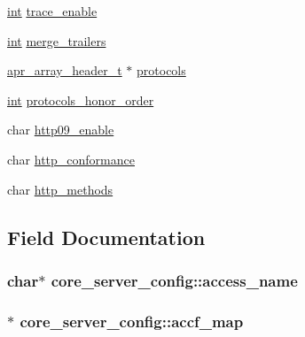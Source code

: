 \begin{DoxyCompactItemize}
\hyperlink{pcre_8txt_a42dfa4ff673c82d8efe7144098fbc198}{int} \hyperlink{structcore__server__config_a598d0e04d0dc423c9f5f9a24ca466a5d}{trace\+\_\+enable}
\item 
\hyperlink{pcre_8txt_a42dfa4ff673c82d8efe7144098fbc198}{int} \hyperlink{structcore__server__config_a2608fe3794c66bb783bff4af1191446a}{merge\+\_\+trailers}
\item 
\hyperlink{structapr__array__header__t}{apr\+\_\+array\+\_\+header\+\_\+t} $\ast$ \hyperlink{structcore__server__config_a81796a04abf27d6f4dabdcdad1d6b13b}{protocols}
\item 
\hyperlink{pcre_8txt_a42dfa4ff673c82d8efe7144098fbc198}{int} \hyperlink{structcore__server__config_a754d83749c2bd25bc387242215750138}{protocols\+\_\+honor\+\_\+order}
\item 
char \hyperlink{structcore__server__config_a82e5cee343c061c3fd801b5405439306}{http09\+\_\+enable}
\item 
char \hyperlink{structcore__server__config_a56088a7f6f6bdf65bc4b125b7bf8a57f}{http\+\_\+conformance}
\item 
char \hyperlink{structcore__server__config_a822309f7371d8df3652e7659beb4d84e}{http\+\_\+methods}
\end{DoxyCompactItemize}


\subsection{Field Documentation}
\subsubsection[{\texorpdfstring{access\+\_\+name}{access_name}}]{\setlength{\rightskip}{0pt plus 5cm}char$\ast$ core\+\_\+server\+\_\+config\+::access\+\_\+name}\hypertarget{structcore__server__config_af42f38dd57b8ae2d4c0f291ac8e7db21}{}\label{structcore__server__config_af42f38dd57b8ae2d4c0f291ac8e7db21}
\subsubsection[{\texorpdfstring{accf\+\_\+map}{accf_map}}]{$\ast$ core\+\_\+server\+\_\+config\+::accf\+\_\+map}\hypertarget{structcore__server__config_aa2952c287c71806b9d36ec80b2d17a54}{}\label{structcore__server__config_aa2952c287c71806b9d36ec80b2d17a54}
